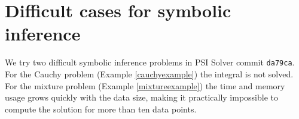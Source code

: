 \documentclass[12pt,vu]{adammath}
\theoremstyle{plain}
\theoremstyle{definition}
\theoremstyle{remark}
\begin{document}
\appendix

\chapter{Difficult cases for symbolic inference}\label{code}
We try two difficult symbolic inference problems in PSI Solver commit \verb!da79ca!.
For the Cauchy problem (Example \ref{cauchyexample}) the integral is not solved.
For the mixture problem (Example \ref{mixtureexample}) the time and memory usage grows quickly with the data size, making it practically impossible to compute the solution for more than ten data points.


\end{document}
